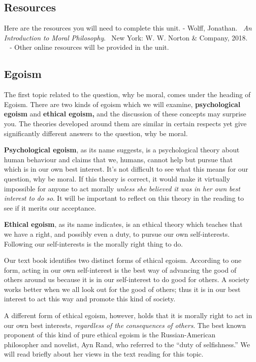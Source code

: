 \documentclass[
]{book}
\begin{document}
\hypertarget{resources-2}{%
\subsection*{Resources}\label{resources-2}}

Here are the resources you will need to complete this unit.
- Wolff, Jonathan. ~\emph{An Introduction to Moral Philosophy}. ~New York: W. W.
Norton \& Company, 2018. ~
- Other online resources will be provided in the unit.

\hypertarget{egoism}{%
\subsection*{Egoism}\label{egoism}}

The first topic related to the question, why be moral, comes under the heading of Egoism. There are two kinds of egoism which we will examine, \textbf{psychological egoism} and \textbf{ethical egoism,} and the discussion of these concepts may surprise you. The theories developed around them are similar in certain respects yet give significantly different answers to the question, why be moral.

\textbf{Psychological egoism}, as its name suggests, is a psychological theory about human behaviour and claims that we, humans, cannot help but pursue that which is in our own best interest. It's not difficult to see what this means for our question, why be moral. If this theory is correct, it would make it virtually impossible for anyone to act morally \emph{unless she believed it was in her own best interest to do so}. It will be important to reflect on this theory in the reading to see if it merits our acceptance.

\textbf{Ethical egoism}, as its name indicates, is an ethical theory which teaches
that we have a right, and possibly even a duty, to pursue our own
self-interests. Following our self-interests is the morally right thing to do.

Our text book identifies two distinct forms of ethical egoism. According to one
form, acting in our own self-interest is the best way of advancing the good of
others around us because it is in our self-interest to do good for others. A
society works better when we all look out for the good of others; thus it is in
our best interest to act this way and promote this kind of society.

A different form of ethical egoism, however, holds that it is morally right to act in our own best interests, \emph{regardless of the consequences of others}. The best known proponent of this kind of pure ethical egoism is the Russian-American philosopher and novelist, Ayn Rand, who referred to the ``duty of selfishness.'' We will read briefly about her views in the text reading for this topic.
\end{document}
